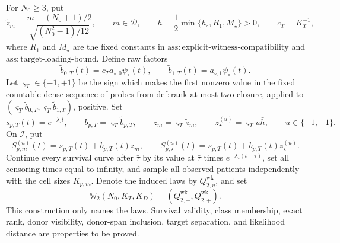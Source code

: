 For \(N_0\ge3\), put
\[
 \widetilde z_m=
 \frac{m-(N_0+1)/2}{\sqrt{(N_0^2-1)/12}},
 \qquad m\in\mathcal D,
 \qquad
 \bar h=\frac12\min\{h_\circ,R_1,M_\star\}>0,
 \qquad c_T=K_T^{-1},
\]
where \(R_1\) and \(M_\star\) are the fixed constants in \(\mathrm{ass:explicit\mbox{-}witness\mbox{-}compatibility}\) and \(\mathrm{ass:target\mbox{-}loading\mbox{-}bound}\).  Define raw factors
\[
 \widetilde b_{0,T}(t)=c_Ta_{\circ,0}\psi_\circ(t),
 \qquad
 \widetilde b_{1,T}(t)=a_{\circ,1}\psi_\circ(t).
\]
Let \(\varsigma_T\in\{-1,+1\}\) be the sign which makes the first nonzero value in the fixed countable dense sequence of probes from \(\mathrm{def:rank\mbox{-}at\mbox{-}most\mbox{-}two\mbox{-}closure}\), applied to \((\varsigma_T\widetilde b_{0,T},\varsigma_T\widetilde b_{1,T})\), positive.  Set
\[
 s_{p,T}(t)=e^{-\lambda_\circ t},
 \qquad b_{p,T}=\varsigma_T\widetilde b_{p,T},
 \qquad z_m=\varsigma_T\widetilde z_m,
 \qquad z_\star^{(u)}=\varsigma_Tu\bar h,
 \qquad u\in\{-1,+1\}.
\]
On \(\mathcal I\), put
\[
 S_{p,m}^{(u)}(t)=s_{p,T}(t)+b_{p,T}(t)z_m,
 \qquad
 S_{p,\star}^{(u)}(t)=s_{p,T}(t)+b_{p,T}(t)z_\star^{(u)}.
\]
Continue every survival curve after \(\bar\tau\) by its value at \(\bar\tau\) times \(e^{-\lambda_\circ(t-\bar\tau)}\), set all censoring times equal to infinity, and sample all observed patients independently with the cell sizes \(K_{p,m}\).  Denote the induced laws by \(Q_{2,u}^{\mathrm{wk}}\), and set
\[
 \mathbb W_2(N_0,K_T,K_D)
 =(Q_{2,-}^{\mathrm{wk}},Q_{2,+}^{\mathrm{wk}}).
\]
This construction only names the laws.  Survival validity, class membership, exact rank, donor visibility, donor-span inclusion, target separation, and likelihood distance are properties to be proved.